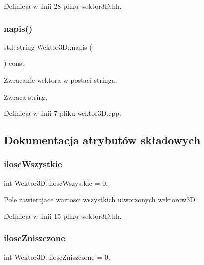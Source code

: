 Definicja w linii 28 pliku wektor3\+D.\+hh.

\mbox{\label{class_wektor3_d_ac331c1650351545bc6f765c63b60ff65}} 
\subsubsection{\texorpdfstring{napis()}{napis()}}
{\footnotesize\ttfamily std\+::string Wektor3\+D\+::napis (\begin{DoxyParamCaption}{ }\end{DoxyParamCaption}) const}

Zwracanie wektora w postaci stringa.

\begin{DoxyReturn}{Zwraca}
string. 
\end{DoxyReturn}


Definicja w linii 7 pliku wektor3\+D.\+cpp.



\subsection{Dokumentacja atrybutów składowych}
\mbox{\label{class_wektor3_d_a2e8ba0afae88b1441e22d7788cc3a651}} 
\subsubsection{\texorpdfstring{iloscWszystkie}{iloscWszystkie}}
{\footnotesize\ttfamily int Wektor3\+D\+::ilosc\+Wszystkie = 0\hspace{0.3cm}{\ttfamily [static]}, {\ttfamily [private]}}

Pole zawierajace wartosci wszystkich utworzonych wektorow3D. 

Definicja w linii 15 pliku wektor3\+D.\+hh.

\mbox{\label{class_wektor3_d_aceae8a0d97d25a838ec509288c5b6cc5}} 
\subsubsection{\texorpdfstring{iloscZniszczone}{iloscZniszczone}}
{\footnotesize\ttfamily int Wektor3\+D\+::ilosc\+Zniszczone = 0\hspace{0.3cm}{\ttfamily [static]}, {\ttfamily [private]}}

